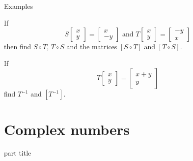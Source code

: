 \documentclass{beamer}
\begin{document}
\begin{frame}{Examples}
\begin{example}
If
\begin{equation*}
S \left[
\begin{array}{c}
x\\
y
\end{array}
\right] = \left[
\begin{array}{c}
x\\
-y
\end{array}
\right]\text{ and } T \left[
\begin{array}{c}
x\\
y
\end{array}
\right] = \left[
\begin{array}{c}
-y\\
x
\end{array}
\right]
\end{equation*}
then find $S\circ T$, $T\circ S$ and the matrices $[S\circ T]$ and $[T\circ S]$.
\end{example}

\begin{example}
If
\begin{equation*}
T \left[
\begin{array}{c}
x\\
y
\end{array}
\right] = \left[
\begin{array}{c}
x+y\\
y
\end{array}
\right]
\end{equation*}
find $T^{-1}$ and $[T^{-1}]$.
\end{example}
\end{frame}


\section{Complex numbers}

\begin{frame}
\begin{beamercolorbox}[sep=12pt,center]{part title}
\insertsection\par
\end{beamercolorbox}
\end{frame}
\end{document}
